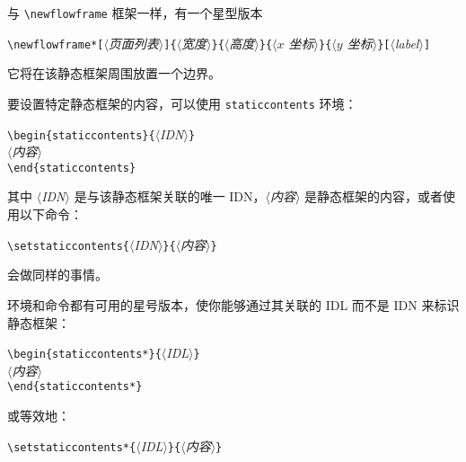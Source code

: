 \documentclass[a4paper]{book}%
\newcommand{\meta}[1]{\textnormal{\ensuremath{\langle}\makebox[0pt][l]{}\emph{#1}\makebox[0pt][l]{}\ensuremath{\rangle}}}
\newcommand{\cmd}[1]{\texttt{#1}}
\begin{document}
与 \verb|\newflowframe| 框架一样，有一个星型版本
\begin{mdframed}
\verb|\newflowframe*[|\meta{页面列表}\verb|]{|\meta{宽度}\verb|}{|\meta{高度}\verb|}{|\meta{$x$ 坐标}\verb|}{|\meta{$y$ 坐标}\verb|}[|\meta{label}\verb|]|
\end{mdframed}
它将在该静态框架周围放置一个边界。

要设置特定静态框架的内容，可以使用 \cmd{staticcontents} 环境：
\begin{mdframed}
\verb|\begin{staticcontents}{|\meta{IDN}\verb|}|\\
\meta{内容}\\
\verb|\end{staticcontents}|
\end{mdframed}
其中 \meta{IDN} 是与该静态框架关联的唯一 IDN，\meta{内容} 是静态框架的内容，或者使用以下命令：
\begin{mdframed}
\verb|\setstaticcontents{|\meta{IDN}\verb|}{|\meta{内容}\verb|}|
\end{mdframed}
会做同样的事情。

环境和命令都有可用的星号版本，使你能够通过其关联的 IDL 而不是 IDN 来标识静态框架：
\begin{mdframed}
\verb|\begin{staticcontents*}{|\meta{IDL}\verb|}|\\
\meta{内容}\\
\verb|\end{staticcontents*}|
\end{mdframed}
或等效地：
\begin{mdframed}
\verb|\setstaticcontents*{|\meta{IDL}\verb|}{|\meta{内容}\verb|}|
\end{mdframed}
\end{document}

